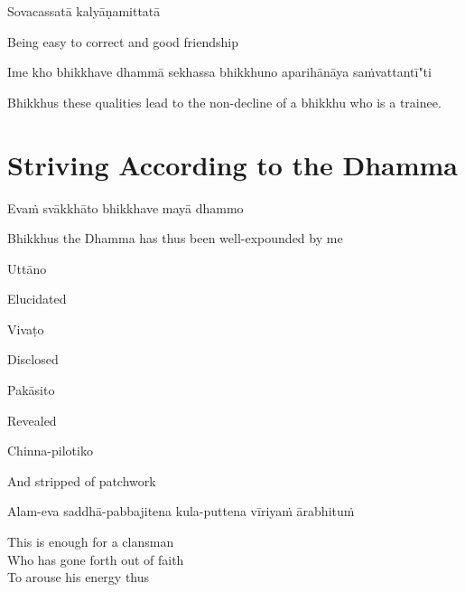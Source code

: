 Sovacassatā kalyāṇamittatā

\begin{cprenglish}
  Being easy to correct and good friendship
\end{cprenglish}

Ime kho bhikkhave dhammā sekhassa bhikkhuno aparihānāya saṁvattantī"ti

\begin{cprenglish}
  Bhikkhus these qualities lead to the non-decline of a bhikkhu who is a trainee.
\end{cprenglish}

\suttaRef{[AN 6.22 \& 8.79]}

\section{Striving According to the Dhamma}
\label{striving-according-to-dhamma}

\begin{leader}
\end{leader}

Evaṁ svākkhāto bhikkhave mayā dhammo

\begin{cprenglish}
  Bhikkhus the Dhamma has thus been well-expounded by me
\end{cprenglish}

Uttāno

\begin{cprenglish}
  Elucidated
\end{cprenglish}

Vivaṭo

\begin{cprenglish}
  Disclosed
\end{cprenglish}

Pakāsito

\begin{cprenglish}
  Revealed
\end{cprenglish}

Chinna-pilotiko

\begin{cprenglish}
  And stripped of patchwork
\end{cprenglish}

Alam-eva saddhā-pabbajitena kula-puttena vīriyaṁ ārabhituṁ

\begin{cprenglish}
  This is enough for a clansman\\
  Who has gone forth out of faith\\
  To arouse his energy thus
\end{cprenglish}

